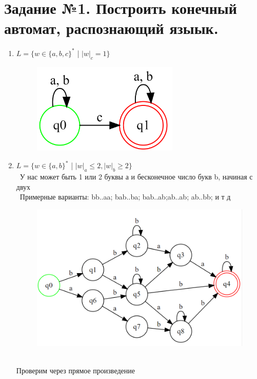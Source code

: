 \documentclass[a4paper]{article}
\begin{document}
\section{Задание №1. Построить конечный автомат, распознающий языык.}
\begin{enumerate}
\item {$L = \{ w \in \{a,b,c\}^*$ | $  {|w|_c} = 1 \} $}\\
\begin{figure}[h]
\centering
\includegraphics[width=7cm]{Задание_№1_1.png}
\end{figure}

\item {$L = \{ w \in \{a,b\}^*$ | $  {|w|_a} \le 2, {|w|_b} \ge 2 \}$}\\ 
\ У нас может быть 1 или 2 буквы а и бесконечное число букв b, начиная с двух\\
\ Примерные варианты: bb..aa; bab..ba; bab..ab;ab..ab; ab..bb;  и т д  \\
\begin{figure}[h]
\centering
\includegraphics[width=18cm]{Задание_№1_2.png}
\end{figure}
\\Проверим через прямое произведение\\


\end{enumerate}
\end{document}
